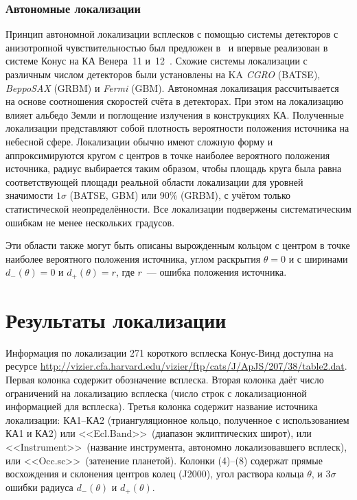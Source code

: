 \subsubsection{Автономные локализации}
Принцип автономной локализации всплесков с помощью системы детекторов с анизотропной 
чувствительностью был предложен в~\citep{Golenetskii_1974CosRe} и впервые реализован 
в системе Конус на КА Венера~11 и~12~\citep{Mazets_1981ApSS}. Схожие системы локализации 
с различным числом детекторов были установлены на KA \textit{CGRO} (BATSE), 
\textit{BeppoSAX} (GRBM) и \textit{Fermi} (GBM). Автономная локализация рассчитывается 
на основе соотношения скоростей счёта в детекторах. При этом на локализацию влияет 
альбедо Земли и поглощение излучения в конструкциях КА. Полученные локализации 
представляют собой плотность вероятности положения источника на небесной сфере. 
Локализации обычно имеют сложную форму и аппроксимируются кругом с центров в точке 
наиболее вероятного положения источника, радиус выбирается таким образом, 
чтобы площадь круга была равна соответствующей площади реальной области локализации 
для уровней значимости $1\sigma$ (BATSE, GBM) или 90\% (GRBM), с учётом только 
статистической неопределённости. Все локализации подвержены систематическим ошибкам 
не менее нескольких градусов.

Эти области также могут быть описаны вырожденным кольцом с центром в точке
наиболее вероятного положения источника, углом раскрытия $\theta =0$ и с ширинами 
$d_{-}(\theta) = 0$ и $d_{+}(\theta)= r$, где $r$~--- ошибка положения источника.

\section{Результаты локализации}
Информация по локализации 271 короткого всплеска Конус-Винд доступна на ресурсе 
\url{http://vizier.cfa.harvard.edu/vizier/ftp/cats/J/ApJS/207/38/table2.dat}.
Первая колонка содержит обозначение всплеска. Вторая колонка даёт 
число ограничений на локализацию всплеска (число строк с локализационной информацией 
для всплеска). Третья колонка содержит название источника локализации: 
КА1–КА2 (триангуляционное кольцо, полученное с использованием КА1 и КА2) или 
<<Ecl.Band>>\ (диапазон эклиптических широт), или <<Instrument>>\ (название инструмента, 
автономно локализовавшего всплеск), или <<Occ.sc>>\ (затенение планетой). 
Колонки (4)--(8) содержат прямые восхождения и склонения центров колец (J2000), 
угол раствора кольца $\theta$, и $3\sigma$ ошибки радиуса $d_{-}(\theta)$ и $d_{+}(\theta)$.

